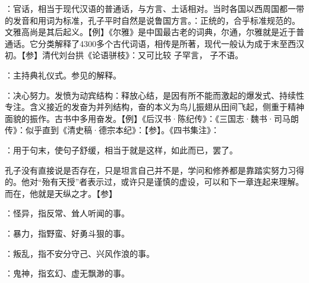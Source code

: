 {
\item {}：官话，相当于现代汉语的普通话，与方言、土话相对。当时各国以西周国都一带的发音和用词为标准，孔子平时自然是说鲁国方言。：正统的，合乎标准规范的。文雅高尚是其后起义。【例】《尔雅》是中国最古老的词典，尔通，尔雅就是近于普通话。它分类解释了4300多个古代词语，相传是所著，现代一般认为成于末至西汉初。【参】清代刘台拱《论语骈枝》：又可比较  子罕言， 子不语。
\item {}：主持典礼仪式。参见的解释。
}
{}


{
\item {}：决心努力。发愤为动宾结构：释放心结，是因有所不能而激起的爆发式、持续性专注。含义接近的发奋为并列结构，奋的本义为鸟儿振翅从田间飞起，侧重于精神面貌的振作。古书中多用奋发。【例】《后汉书·陈纪传》：《三国志·魏书·司马朗传》：似乎直到《清史稿·德宗本纪》：【参】。《四书集注》：
\item {}：用于句末，使句子舒缓，相当于就是这样，如此而已，罢了。
}
{}


{
\item 孔子没有直接说是否存在，只是坦言自己并不是，学问和修养都是靠踏实努力习得的。他对“殆有天授”者表示过，或许只是谨慎的虚设，可以和下一章连起来理解。而在，他就是天纵之才。【参】 
}
{}


{
\item {}：怪异，指反常、耸人听闻的事。
\item {}：暴力，指野蛮、好勇斗狠的事。
\item {}：叛乱，指不安分守己、兴风作浪的事。
\item {}：鬼神，指玄幻、虚无飘渺的事。
}
{}


